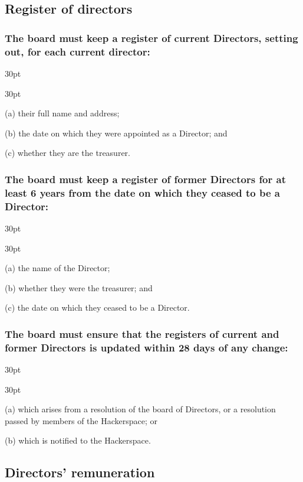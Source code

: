 \documentclass[12pt]{article}
\def\clauseindent{30pt}
\newenvironment{subindentlist}{\raggedright\begin{adjustwidth}{\clauseindent}{}\begin{labeledlist}{\clauseindent}}{\end{labeledlist}\end{adjustwidth}}
\begin{document}
\subsection{Register of directors}
\subsubsection[Register of current Directors]{The board must keep a register of current Directors, setting out, for each current director:}
\begin{subindentlist}
    \item [(a)] their full name and address;
    \item [(b)] the date on which they were appointed as a Director; and
    \item [(c)] whether they are the treasurer.
\end{subindentlist}
\subsubsection[Register of former Directors]{The board must keep a register of former Directors for at least 6 years from the date on which they ceased to be a Director:}
\begin{subindentlist}
    \item [(a)] the name of the Director;
    \item [(b)] whether they were the treasurer; and
    \item [(c)] the date on which they ceased to be a Director.
\end{subindentlist}
\subsubsection[Company must keep registers of Directors up to date]{The board must ensure that the registers of current and former Directors is updated within 28 days of any change:}
\begin{subindentlist}
    \item [(a)] which arises from a resolution of the board of Directors, or a resolution passed by members of the Hackerspace; or
    \item [(b)] which is notified to the Hackerspace.
\end{subindentlist}

\subsection{Directors' remuneration}
\end{document}
